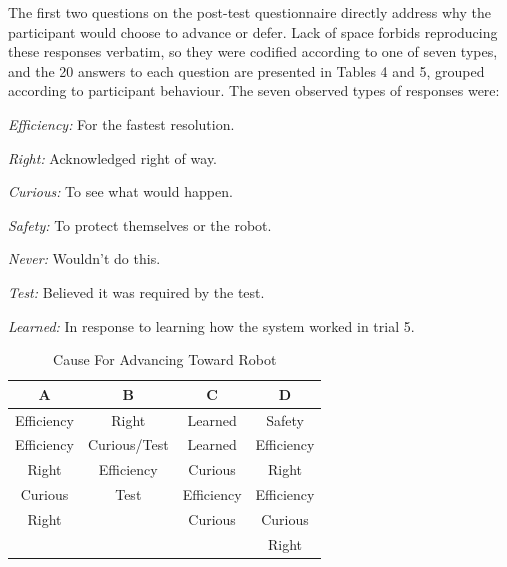 \documentclass[letterpaper, 10 pt, conference]{ieeeconf}  %
\begin{document}

The first two questions on the post-test questionnaire directly address why the participant would choose to advance or defer. Lack of space forbids reproducing these responses verbatim, so they were codified according to one of seven types, and the 20 answers to each question are presented in Tables 4 and 5, grouped according to participant behaviour. The seven observed types of responses were:

\textit{Efficiency:} For the fastest resolution.

\textit{Right:} Acknowledged right of way.

\textit{Curious:} To see what would happen.

\textit{Safety:} To protect themselves or the robot.

\textit{Never:} Wouldn't do this.

\textit{Test:} Believed it was required by the test.

\textit{Learned:} In response to learning how the system worked in trial 5.

\begin{table}[h]
\caption{Cause For Advancing Toward Robot}
\label{Advance}
\begin{center}
\begin{tabular}{|c||c||c||c|}
\hline
\textbf{A} & \textbf{B} & \textbf{C} & \textbf{D}\\
\hline
Efficiency & Right & Learned & Safety\\
\hline
Efficiency & Curious/Test & Learned & Efficiency\\
\hline
Right & Efficiency & Curious & Right\\
\hline
Curious & Test & Efficiency & Efficiency\\
\hline
Right & & Curious & Curious\\
\hline
 & & & Right\\
\hline
\end{tabular}
\end{center}
\end{table}
\end{document}
